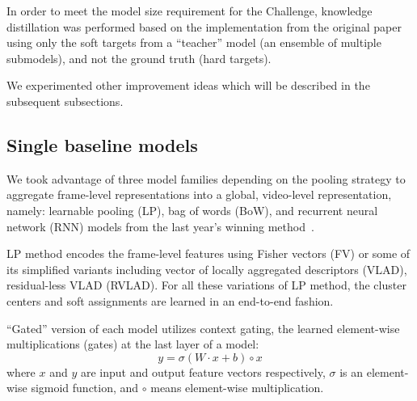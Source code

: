 \documentclass[runningheads]{llncs}
\begin{document}
In order to meet the model size requirement for the Challenge, knowledge distillation was performed based on the implementation from the original paper~\cite{hinton2014} using only the soft targets from a ``teacher'' model (an ensemble of multiple submodels), and not the ground truth (hard targets).

We experimented other improvement ideas which will be described in the subsequent subsections.

\subsection{Single baseline models}
We took advantage of three model families depending on the pooling strategy to aggregate frame-level representations into a global, video-level representation, namely: learnable pooling (LP), bag of words (BoW), and recurrent neural network (RNN) models from the last year's winning method~\cite{miech2017}.

LP method encodes the frame-level features using Fisher vectors (FV) or some of its simplified variants including vector of locally aggregated descriptors (VLAD), residual-less VLAD (RVLAD).
For all these variations of LP method, the cluster centers and soft assignments are learned in an end-to-end fashion.

``Gated'' version of each model utilizes context gating, the learned element-wise multiplications (gates) at the last layer of a model:
\begin{equation}
y = \sigma (W \cdot x + b) \circ x
\end{equation}
where $x$ and $y$ are input and output feature vectors respectively, $\sigma$ is an element-wise sigmoid function, and $\circ$ means element-wise multiplication.
\end{document}
